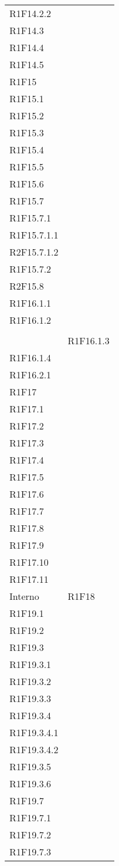 \begin{longtable}{ >{\centering}p{}
			>{\centering}p{}}
	R1F14.2.2\\ 
	R1F14.3\\ 
	R1F14.4\\ 
	R1F14.5\\ 
	R1F15\\ 
	R1F15.1\\ 
	R1F15.2\\ 
	R1F15.3\\ 
	R1F15.4\\ 
	R1F15.5\\ 
	R1F15.6\\ 
	R1F15.7\\ 
	R1F15.7.1\\ 
	R1F15.7.1.1\\ 
	R2F15.7.1.2\\ 
	R1F15.7.2\\ 
	R2F15.8\\ 
	R1F16.1.1 \\
	R1F16.1.2\tabularnewline \rowcolordark &
	\tabularnewline & 
	R1F16.1.3\\ 
	R1F16.1.4\\ 
	R1F16.2.1\\ 
	R1F17\\ 
	R1F17.1\\ 
	R1F17.2\\ 
	R1F17.3\\ 
	R1F17.4\\ 
	R1F17.5\\ 
	R1F17.6\\ 
	R1F17.7\\ 
	R1F17.8\\ 
	R1F17.9\\ 
	R1F17.10\\ 
	R1F17.11 \tabularnewline
	Interno	&	
	R1F18\\ 
	R1F19.1\\ 
	R1F19.2\\ 
	R1F19.3\\ 
	R1F19.3.1\\ 
	R1F19.3.2\\ 
	R1F19.3.3\\ 
	R1F19.3.4\\ 
	R1F19.3.4.1\\ 
	R1F19.3.4.2\\ 
	R1F19.3.5\\ 
	R1F19.3.6\\ 
	R1F19.7\\ 
	R1F19.7.1\\ 
	R1F19.7.2\\ 
	R1F19.7.3\\ 

\end{longtable}
